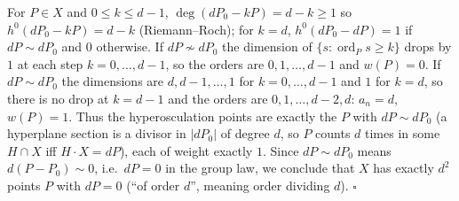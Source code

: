 \documentclass[11pt]{article}
\begin{document}
For $P\in X$ and $0\le k\le d-1$, $\deg(dP_0-kP)=d-k\ge1$ so $h^0(dP_0-kP)=d-k$ (Riemann--Roch); for $k=d$, $h^0(dP_0-dP)=1$ if $dP\sim dP_0$ and $0$ otherwise. If $dP\not\sim dP_0$ the dimension of $\{s:\operatorname{ord}_Ps\ge k\}$ drops by $1$ at each step $k=0,\dots,d-1$, so the orders are $0,1,\dots,d-1$ and $w(P)=0$. If $dP\sim dP_0$ the dimensions are $d,d-1,\dots,1$ for $k=0,\dots,d-1$ and $1$ for $k=d$, so there is no drop at $k=d-1$ and the orders are $0,1,\dots,d-2,d$: $a_n=d$, $w(P)=1$. Thus the hyperosculation points are exactly the $P$ with $dP\sim dP_0$ (a hyperplane section is a divisor in $|dP_0|$ of degree $d$, so $P$ counts $d$ times in some $H\cap X$ iff $H\cdot X=dP$), each of weight exactly $1$. Since $dP\sim dP_0$ means $d(P-P_0)\sim0$, i.e.\ $dP=0$ in the group law, we conclude that $X$ has exactly $d^2$ points $P$ with $dP=0$ (``of order $d$'', meaning order dividing $d$). \hfill$\square$
\end{document}
